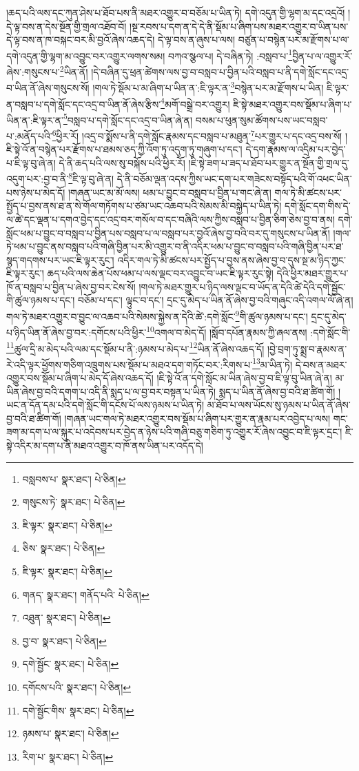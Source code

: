 །ཆད་པའི་ལས་དང་ཀུན་ཤེས་པ་ཐོབ་པས་ནི་མཐར་འགྱུར་བ་བཅོམ་པ་ཡིན་ཏེ། དགེ་འདུན་གྱི་ལྷག་མ་དང་འདྲའོ། །དེ་ལྟ་བས་ན་དེས་སྔོན་གྱི་གྲལ་འཐོབ་བོ། །སྔ་རབས་པ་དག་ན་དེ་དེ་ནི་སྡོམ་པ་ཞིག་པས་མཐར་འགྱུར་བ་ཡིན་པས་དེ་ལྟ་བས་ན་ཁ་བསྐང་བར་མི་བྱའོ་ཞེས་འཆད་དེ། དེ་ལྟ་བས་ན་ཞུས་པ་ལས། བཙུན་པ་བསྙེན་པར་མ་རྫོགས་པ་ལ་དགེ་འདུན་གྱི་ལྷག་མ་འབྱུང་བར་འགྱུར་ལགས་སམ། བཀའ་སྩལ་པ། དེ་བཞིན་ཏེ། :བསླབ་པ་\footnote{བསླབས་པ་  སྣར་ཐང་།  པེ་ཅིན། }བྱིན་པ་ལ་འགྱུར་རོ་ཞེས་:གསུངས་པ་\footnote{གསུངས་ཏེ་  སྣར་ཐང་།  པེ་ཅིན། }ཡིན་ནོ། །དེ་བཞིན་དུ་ཕྲན་ཚེགས་ལས་བྱ་བ་བསླབ་པ་བྱིན་པའི་བསླབ་པ་ནི་དགེ་སློང་དང་འདྲ་བ་ཡིན་ནོ་ཞེས་གསུངས་སོ། །གལ་ཏེ་སྡོམ་པ་མ་ཞིག་པ་ཡིན་ན་:ཇི་ལྟར་ན་\footnote{ཇི་ལྟར་  སྣར་ཐང་།  པེ་ཅིན། }བསྙེན་པར་མ་རྫོགས་པ་ཡིན། ཇི་ལྟར་ན་བསླབ་པ་དགེ་སློང་དང་འདྲ་བ་ཡིན་ནོ་ཞེས་རྩིས་\footnote{ཅིས་  སྣར་ཐང་།  པེ་ཅིན། }མགོ་བསྒྲེ་བར་འགྱུར། ཇི་སྟེ་མཐར་འགྱུར་བས་སྡོམ་པ་ཞིག་པ་ཡིན་ན་:ཇི་ལྟར་ན་\footnote{ཇི་ལྟར་  སྣར་ཐང་།  པེ་ཅིན། }བསླབ་པ་དགེ་སློང་དང་འདྲ་བ་ཡིན་ཞེ་ན། བསམ་པ་ཕུན་སུམ་ཚོགས་པས་ཡང་བསླབ་པ་:མནོད་པའི་\footnote{གནད་  སྣར་ཐང་། གནོད་པའི་  པེ་ཅིན། }ཕྱིར་རོ། །འདྲ་བ་སྨོས་པ་ནི་དགེ་སློང་རྣམས་དང་བསླབ་པ་མཐུན་\footnote{འཐུན་  སྣར་ཐང་།  པེ་ཅིན། }པར་གྱུར་པ་དང་འདྲ་བས་སོ། །ཇི་སྟེ་འོ་ན་བསྙེན་པར་རྫོགས་པ་ཐམས་ཅད་ཀྱི་འོག་ཏུ་འདུག་ཏུ་གཞུག་པ་དང་། དེ་དག་རྣམས་ལ་འདྲིམ་པར་བྱེད་པ་ཇི་ལྟ་བུ་ཞེ་ན། དེ་ནི་ཆད་པའི་ལས་སུ་བསྐོས་པའི་ཕྱིར་རོ། །ཇི་སྟེ་ཟག་པ་ཟད་པ་ཐོབ་པར་གྱུར་ན་སྔོན་གྱི་གྲལ་དུ་འདུག་པར་:བྱ་བ་ནི་\footnote{བྱ་བ་  སྣར་ཐང་།  པེ་ཅིན། }ཇི་ལྟ་བུ་ཞེ་ན། དེ་ནི་བཅོམ་ལྡན་འདས་ཀྱིས་ཡང་དག་པར་གཟེངས་བསྟོད་པའི་གོ་འཕང་ཡིན་པས་ཉེས་པ་མེད་དོ། །གཞན་ཡང་མ་མོ་ལས། ཕམ་པ་བྱུང་བ་བསླབ་པ་བྱིན་པ་གང་ཞེ་ན། གལ་ཏེ་མི་ཚངས་པར་སྤྱོད་པ་བྱས་ནས་ཐ་ན་སེ་གོལ་གཏོགས་པ་ཙམ་ཡང་འཆབ་པའི་སེམས་མི་བསྐྱེད་པ་ཡིན་ཏེ། དགེ་སློང་དག་གིས་དེ་ལ་ཚེ་དང་ལྡན་པ་དགའ་བྱེད་དང་འདྲ་བར་གསོལ་བ་དང་བཞིའི་ལས་ཀྱིས་བསླབ་པ་བྱིན་ཅིག་ཅེས་བྱ་བ་ནས། དགེ་སློང་ཕམ་པ་བྱུང་བ་བསླབ་པ་བྱིན་པས་བསླབ་པ་ལ་བསླབ་པར་བྱའོ་ཞེས་བྱ་བའི་བར་དུ་གསུངས་པ་ཡིན་ནོ། །གལ་ཏེ་ཕམ་པ་བྱུང་ནས་བསླབ་པའི་གཞི་བྱིན་པར་མི་འགྱུར་བ་ནི་འདིར་ཕམ་པ་བྱུང་བ་བསླབ་པའི་གཞི་བྱིན་པར་ཐ་སྙད་གདགས་པར་ཡང་ཇི་ལྟར་རུང་། འདིར་གལ་ཏེ་མི་ཚངས་པར་སྤྱོད་པ་བྱས་ནས་ཞེས་བྱ་བ་དུས་སྔ་མ་ཉིད་ཀྱང་ཇི་ལྟར་རུང་། ཆད་པའི་ལས་ཆེན་པོས་ཕམ་པ་ལས་ལྡང་བར་འབྱུང་བ་ཡང་ཇི་ལྟར་རུང་སྟེ། དེའི་ཕྱིར་མཐར་གྱུར་པ་ཁོ་ན་བསླབ་པ་བྱིན་པ་ཞེས་བྱ་བར་ངེས་སོ། །གལ་ཏེ་མཐར་གྱུར་པ་ཉིད་ལས་ལྡང་བ་ཡོད་ན་དེའི་ཚེ་དེའི་དགེ་སྦྱོང་གི་ཚུལ་ཉམས་པ་དང་། བཅོམ་པ་དང་། ལྟུང་བ་དང་། དྲང་དུ་མེད་པ་ཡིན་ནོ་ཞེས་བྱ་བའི་གཞུང་འདི་འགལ་ལོ་ཞེ་ན། གལ་ཏེ་མཐར་འགྱུར་བ་བྱུང་ལ་འཆབ་པའི་སེམས་སྐྱེས་ན་དེའི་ཚེ་:དགེ་སློང་\footnote{དགེ་སྦྱོང་  སྣར་ཐང་།  པེ་ཅིན། }གི་ཚུལ་ཉམས་པ་དང་། དྲང་དུ་མེད་པ་ཉིད་ཡིན་ནོ་ཞེས་བྱ་བར་:དགོངས་པའི་ཕྱིར་\footnote{དགོངས་པའི་  སྣར་ཐང་།  པེ་ཅིན། }འགལ་བ་མེད་དོ། །སློབ་དཔོན་རྣམས་ཀྱི་ཞལ་ནས། :དགེ་སློང་གི་\footnote{དགེ་སྦྱོང་གིས་  སྣར་ཐང་།  པེ་ཅིན། }ཚུལ་དྲི་མ་མེད་པའི་ལམ་དང་སྡོམ་པ་ནི་:ཉམས་པ་མེད་པ་\footnote{ཉམས་པ་  སྣར་ཐང་།  པེ་ཅིན། }ཡིན་ནོ་ཞེས་འཆད་དོ། །བྱེ་བྲག་ཏུ་སྨྲ་བ་རྣམས་ན་རེ་འདི་ལྟར་ཕྱོགས་གཅིག་འཁྲུགས་པས་སྡོམ་པ་མཐའ་དག་གཏོང་བར་:རིགས་པ་\footnote{རིག་པ་  སྣར་ཐང་།  པེ་ཅིན། }མ་ཡིན་ཏེ། དེ་བས་ན་མཐར་འགྱུར་བས་སྡོམ་པ་ཞིག་པ་མེད་དོ་ཞེས་འཆད་དོ། །ཇི་སྟེ་འོ་ན་དགེ་སློང་མ་ཡིན་ཞེས་བྱ་བ་ཇི་ལྟ་བུ་ཡིན་ཞེ་ན། མ་ཡིན་ཞེས་བྱ་བའི་དགག་པ་འདི་ནི་སྨད་པ་ལ་བྱ་བར་བསྟན་པ་ཡིན་ཏེ། སྨད་པ་ཡིན་ནོ་ཞེས་བྱ་བའི་ཐ་ཚིག་གོ། །ཡང་ན་དོན་དམ་པའི་དགེ་སློང་གི་དངོས་པོ་ལས་ཉམས་པ་ཡིན་ཏེ། མ་ཐོབ་པ་ལས་ཡོངས་སུ་ཉམས་པ་ཡིན་ནོ་ཞེས་བྱ་བའི་ཐ་ཚིག་གོ། །གཞན་ཡང་གལ་ཏེ་མཐར་འགྱུར་བས་སྡོམ་པ་ཞིག་པར་གྱུར་ན་རྣམ་པར་འབྱེད་པ་ལས། གང་ཟག་མ་དག་པ་ལ་སྐུར་པ་འདེབས་པར་བྱེད་ན་ཉེས་པའི་གཞི་བཅུ་གཅིག་ཏུ་འགྱུར་རོ་ཞེས་འབྱུང་བ་ཇི་ལྟར་དྲང་། ཇི་སྟེ་འདིར་མ་དག་པ་ནི་མཐའ་འགྱུར་བ་ཁོ་ནས་ཡིན་པར་འདོད་དེ། 
